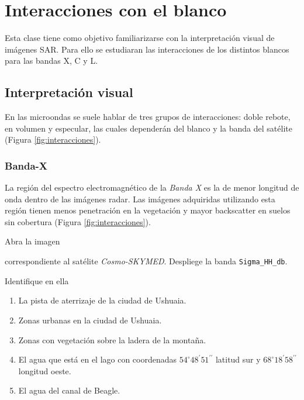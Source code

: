 \chapter{Interacciones con el blanco}

Esta clase tiene como objetivo familiarizarse con la interpretación visual de imágenes SAR. Para ello se estudiaran las interacciones de los distintos blancos para las bandas X, C y L.

\section{Interpretación visual}

En las microondas se suele hablar de tres grupos de interacciones: doble rebote, en volumen y especular, las cuales dependerán del blanco y la banda del satélite (Figura \ref{fig:interacciones}).

\subsection{Banda-X}

La región del espectro electromagnético de la \emph{Banda X} es la de menor longitud de onda dentro de las imágenes radar. Las imágenes adquiridas utilizando esta región tienen menos penetración en la vegetación y mayor backscatter en suelos sin cobertura (Figura \ref{fig:interacciones}).

Abra la imagen
\begin{center}
\end{center}
correspondiente al satélite \emph{Cosmo-SKYMED}. Despliege la banda \texttt{Sigma\_HH\_db}.

Identifique en ella

\begin{enumerate}
    \item La pista de aterrizaje de la ciudad de Ushuaia.
    \item Zonas urbanas en la ciudad de Ushuaia.
    \item Zonas con vegetación sobre la ladera de la montaña.
    \item El agua que está en el lago con coordenadas $54^\circ 48^\prime 51^{\prime\prime}$ latitud sur y $68^\circ 18^\prime 58^{\prime\prime}$ longitud oeste.
    \item El agua del canal de Beagle.
\end{enumerate}

